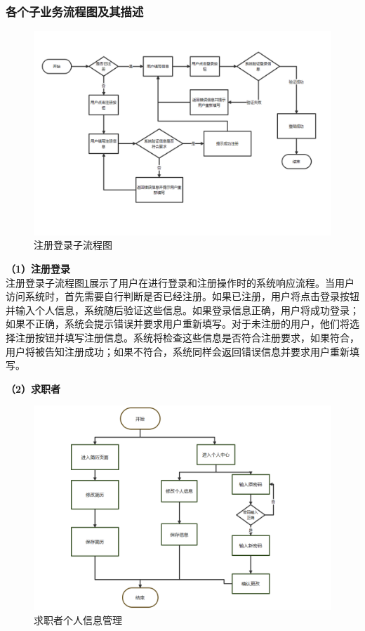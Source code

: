 \documentclass[UTF8,a4paper,10pt]{ctexart}
\begin{document}
\subsubsection{各个子业务流程图及其描述}

\begin{figure}[H]
    \centering
    \includegraphics[width=\textwidth]{img/登陆子流程图.png}
    \caption{注册登录子流程图}
    \label{fig:注册登录子流程图}
\end{figure}

\textbf{（1）注册登录} \\注册登录子流程图\ref{fig:注册登录子流程图}展示了用户在进行登录和注册操作时的系统响应流程。当用户访问系统时，首先需要自行判断是否已经注册。如果已注册，用户将点击登录按钮并输入个人信息，系统随后验证这些信息。如果登录信息正确，用户将成功登录；如果不正确，系统会提示错误并要求用户重新填写。对于未注册的用户，他们将选择注册按钮并填写注册信息。系统将检查这些信息是否符合注册要求，如果符合，用户将被告知注册成功；如果不符合，系统同样会返回错误信息并要求用户重新填写。

\textbf{（2）求职者} \\
\begin{figure}[H]
    \centering
    \includegraphics[width=\textwidth]{img/求职者个人信息管理.png}
    \caption{求职者个人信息管理}
    \label{fig:求职者个人信息管理}
\end{figure}
\end{document}
